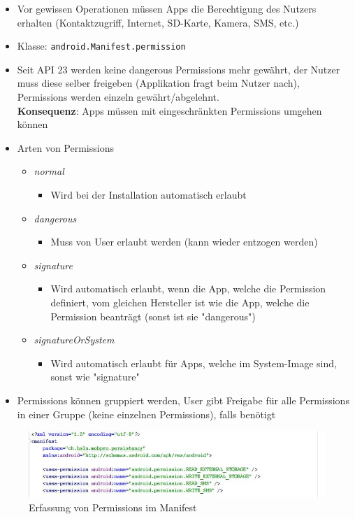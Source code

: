 \documentclass[a4paper]{article}
\begin{document}
	\begin{itemize}
		\item Vor gewissen Operationen müssen Apps die Berechtigung des Nutzers erhalten (Kontaktzugriff, Internet, SD-Karte, Kamera, SMS, etc.)
		\item Klasse: \texttt{android.Manifest.permission}
		\item Seit API 23 werden keine dangerous Permissions mehr gewährt, der Nutzer muss diese selber freigeben (Applikation fragt beim Nutzer nach), Permissions werden einzeln gewährt/abgelehnt.\\
		\textbf{Konsequenz}: Apps müssen mit eingeschränkten Permissions umgehen können
		\item Arten von Permissions
		\begin{itemize}
			\item \textit{normal}
				\begin{itemize}
					\item Wird bei der Installation automatisch erlaubt
				\end{itemize}
			\item \textit{dangerous}
				\begin{itemize}
					\item Muss von User erlaubt werden (kann wieder entzogen werden)
				\end{itemize}
			\item \textit{signature}
				\begin{itemize}
					\item Wird automatisch erlaubt, wenn die App, welche die Permission definiert, vom gleichen Hersteller ist wie die App, welche die Permission beanträgt (sonst ist sie "dangerous")
				\end{itemize}
			\item \textit{signatureOrSystem}
				\begin{itemize}
					\item Wird automatisch erlaubt für Apps, welche im System-Image sind, sonst wie "signature"
				\end{itemize}
		\end{itemize}
		\item Permissions können gruppiert werden, User gibt Freigabe für alle Permissions in einer Gruppe (keine einzelnen Permissions), falls benötigt
	\end{itemize}
	
	\begin{figure}[htb!]
		\centering
		\includegraphics[width=.7\textwidth]{img/manifest_permissions.jpg}
		\caption{Erfassung von Permissions im Manifest}
	\end{figure}
\end{document}
